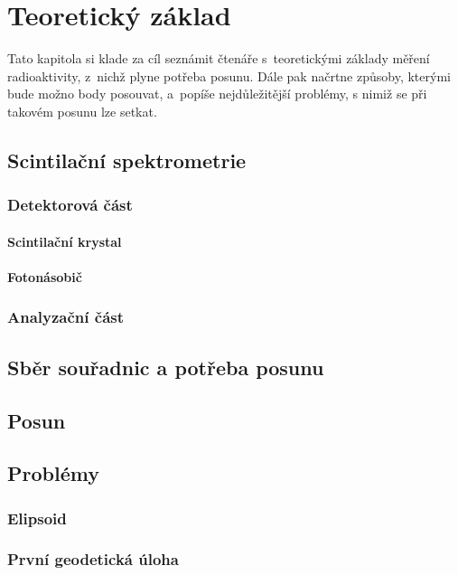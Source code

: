 \chapter{Teoretický základ}
\label{2-teorie}

Tato kapitola si klade za cíl seznámit čtenáře s~teoretickými základy měření radioaktivity, z~nichž
plyne potřeba posunu. Dále pak načrtne způsoby, kterými bude možno body posouvat, a~popíše
nejdůležitější problémy, s nimiž se při takovém posunu lze setkat. 

\section{Scintilační spektrometrie}
\label{spektrometrie}

\subsection{Detektorová část}
\label{detektor}

\subsubsection{Scintilační krystal}
\label{krystal}

\subsubsection{Fotonásobič}
\label{fotonasobic}

\subsection{Analyzační část}
\label{analyzator}


\section{Sběr souřadnic a potřeba posunu}
\label{potreba posunu}


\section{Posun}
\label{posun}


\section{Problémy}
\label{problemy}

\subsection{Elipsoid}
\label{elipsoid}


\subsection{První geodetická úloha}
\label{prvnigu}


